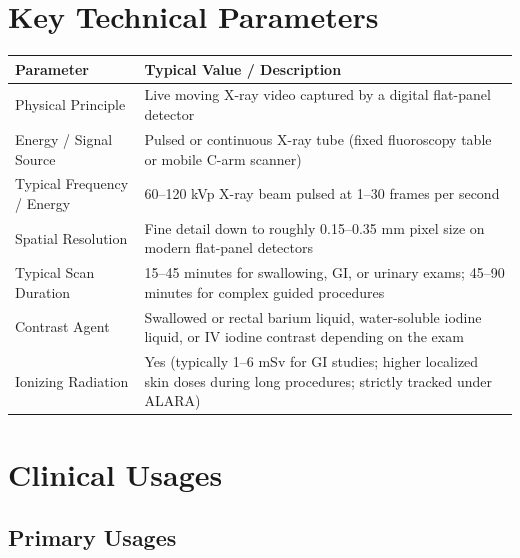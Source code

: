 \section{Key Technical Parameters}

\noindent\begin{tabularx}{\textwidth}{@{}l X@{}}
\toprule
\textbf{Parameter} & \textbf{Typical Value / Description} \\
\midrule
Physical Principle & Live moving X-ray video captured by a digital flat-panel detector \\
Energy / Signal Source & Pulsed or continuous X-ray tube (fixed fluoroscopy table or mobile C-arm scanner) \\
Typical Frequency / Energy & 60--120 kVp X-ray beam pulsed at 1--30 frames per second \\
Spatial Resolution & Fine detail down to roughly 0.15--0.35 mm pixel size on modern flat-panel detectors \\
Typical Scan Duration & 15--45 minutes for swallowing, GI, or urinary exams; 45--90 minutes for complex guided procedures \\
Contrast Agent & Swallowed or rectal barium liquid, water-soluble iodine liquid, or IV iodine contrast depending on the exam \\
Ionizing Radiation & Yes (typically 1--6 mSv for GI studies; higher localized skin doses during long procedures; strictly tracked under ALARA) \\
\bottomrule
\end{tabularx}

\section{Clinical Usages}

\subsection{Primary Usages}

